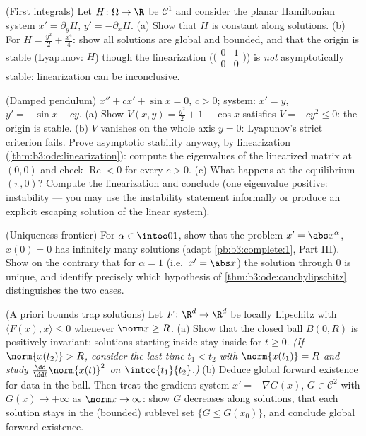 \begin{exercise}[$\star\star$]\label{exo:b3:ode:7}
(First integrals) Let $H \colon \Omega \to \R$ be $\mathcal
C^1$ and consider the planar Hamiltonian system $x' =
\partial_yH$, $y' = -\partial_xH$.
(a) Show that $H$ is constant along solutions.
(b) For $H = \frac{y^2}2 + \frac{x^4}4$: show all solutions
are global and bounded, and that the origin is stable
(Lyapunov: $H$) though the linearization
($\bigl(\begin{smallmatrix}0&1\\0&0\end{smallmatrix}\bigr)$)
is \emph{not} asymptotically stable: linearization can be
inconclusive.
\end{exercise}

\begin{exercise}[$\star\star\star$]\label{exo:b3:ode:8}
(Damped pendulum) $x'' + cx' + \sin x = 0$, $c > 0$; system:
$x' = y$, $y' = -\sin x - cy$.
(a) Show $V(x, y) = \frac{y^2}2 + 1 - \cos x$ satisfies $\dot
V = -cy^2 \leq 0$: the origin is stable.
(b) $\dot V$ vanishes on the whole axis $y = 0$: Lyapunov's
strict criterion fails. Prove asymptotic stability anyway,
by linearization (\cref{thm:b3:ode:linearization}): compute
the eigenvalues of the linearized matrix at $(0,0)$ and check
$\operatorname{Re} < 0$ for every $c > 0$.
(c) What happens at the equilibrium $(\pi, 0)$? Compute the
linearization and conclude (one eigenvalue positive:
instability --- you may use the instability statement
informally or produce an explicit escaping solution of the
linear system).
\end{exercise}

\begin{exercise}[$\star\star$]\label{exo:b3:ode:9}
(Uniqueness frontier) For $\alpha \in \intoo01$, show that
the problem $x' = \abs x^{\alpha}$, $x(0) = 0$ has infinitely
many solutions (adapt \cref{pb:b3:complete:1}, Part III).
Show on the contrary that for $\alpha = 1$ (i.e.\ $x' = \abs
x$) the solution through $0$ is unique, and identify
precisely which hypothesis of
\cref{thm:b3:ode:cauchylipschitz} distinguishes the two
cases.
\end{exercise}

\begin{exercise}[$\star\star\star$]\label{exo:b3:ode:10}
(A priori bounds trap solutions) Let $F \colon \R^d \to \R^d$
be locally Lipschitz with $\langle F(x), x\rangle \leq 0$
whenever $\norm x \geq R$.
(a) Show that the closed ball $\bar B(0, R)$ is positively
invariant: solutions starting inside stay inside for $t \geq
0$. \emph{(If $\norm{x(t_2)} > R$, consider the last time
$t_1 < t_2$ with $\norm{x(t_1)} = R$ and study
$\frac{\dd}{\dd t}\norm{x(t)}^2$ on $\intcc{t_1}{t_2}$.)}
(b) Deduce global forward existence for data in the ball.
Then treat the gradient system $x' = -\nabla G(x)$, $G \in
\mathcal C^2$ with $G(x) \to +\infty$ as $\norm x \to
\infty$: show $G$ decreases along solutions, that each
solution stays in the (bounded) sublevel set $\{G \leq
G(x_0)\}$, and conclude global forward existence.
\end{exercise}


